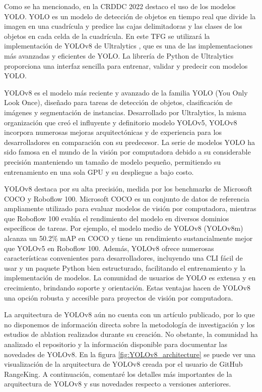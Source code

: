 Como se ha mencionado, en la CRDDC 2022 destaco el uso de los modelos YOLO. YOLO \cite{YOLO} es un modelo de detección de objetos en tiempo real que divide la imagen en una cuadrícula y predice las cajas delimitadoras y las clases de los objetos en cada celda de la cuadrícula. En este TFG se utilizará la implementación de YOLOv8 de Ultralytics \cite{yolov8_ultralytics}, que es una de las implementaciones más avanzadas y eficientes de YOLO. La librería de Python de Ultralytics proporciona una interfaz sencilla para entrenar, validar y predecir con modelos YOLO.

YOLOv8 es el modelo más reciente y avanzado de la familia YOLO (You Only Look Once), diseñado para tareas de detección de objetos, clasificación de imágenes y segmentación de instancias. Desarrollado por Ultralytics, la misma organización que creó el influyente y definitorio modelo YOLOv5, YOLOv8 incorpora numerosas mejoras arquitectónicas y de experiencia para los desarrolladores en comparación con su predecesor. La serie de modelos YOLO ha sido famosa en el mundo de la visión por computadora debido a su considerable precisión manteniendo un tamaño de modelo pequeño, permitiendo su entrenamiento en una sola GPU y su despliegue a bajo costo.

YOLOv8 destaca por su alta precisión, medida por los benchmarks de Microsoft COCO y Roboflow 100. Microsoft COCO es un conjunto de datos de referencia ampliamente utilizado para evaluar modelos de visión por computadora, mientras que Roboflow 100 evalúa el rendimiento del modelo en diversos dominios específicos de tareas. Por ejemplo, el modelo medio de YOLOv8 (YOLOv8m) alcanza un 50.2\% mAP en COCO y tiene un rendimiento sustancialmente mejor que YOLOv5 en Roboflow 100. Además, YOLOv8 ofrece numerosas características convenientes para desarrolladores, incluyendo una CLI fácil de usar y un paquete Python bien estructurado, facilitando el entrenamiento y la implementación de modelos. La comunidad de usuarios de YOLO es extensa y en crecimiento, brindando soporte y orientación. Estas ventajas hacen de YOLOv8 una opción robusta y accesible para proyectos de visión por computadora.

La arquitectura de YOLOv8 aún no cuenta con un artículo publicado, por lo que no disponemos de información directa sobre la metodología de investigación y los estudios de ablation realizados durante su creación. No obstante, la comunidad ha analizado el repositorio y la información disponible para documentar las novedades de YOLOv8. En la figura \ref{fig:YOLOv8_architecture} se puede ver una visualización de la arquitectura de YOLOv8 creada por el usuario de GitHub RangeKing\cite{RangeKing_GitHub}. A continuación, comentaré los detalles más importantes de la arquitectura de YOLOv8 y sus novedades respecto a versiones anteriores. \cite{whats-new-in-yolov8} \cite{yolov8-architecture-blog} \cite{yolov8-architecture-blog2}

